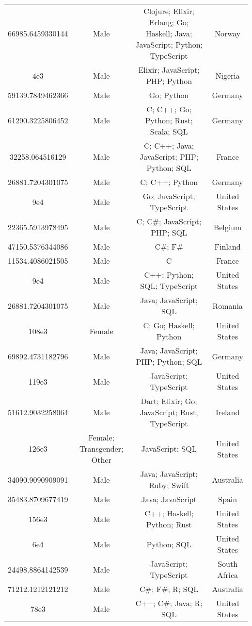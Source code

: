 \begin{center}
\begin{tabular}{ |c|c|c|c| }
66985.6459330144  &  Male  &  Clojure; Elixir; Erlang; Go; Haskell; Java; JavaScript; Python; TypeScript  &  Norway  \\ 
4e3  &  Male  &  Elixir; JavaScript; PHP; Python  &  Nigeria  \\ 
59139.7849462366  &  Male  &  Go; Python  &  Germany  \\ 
61290.3225806452  &  Male  &  C; C++; Go; Python; Rust; Scala; SQL  &  Germany  \\ 
32258.064516129  &  Male  &  C; C++; Java; JavaScript; PHP; Python; SQL  &  France  \\ 
26881.7204301075  &  Male  &  C; C++; Python  &  Germany  \\ 
9e4  &  Male  &  Go; JavaScript; TypeScript  &  United States  \\ 
22365.5913978495  &  Male  &  C; C\#; JavaScript; PHP; SQL  &  Belgium  \\ 
47150.5376344086  &  Male  &  C\#; F\#  &  Finland  \\ 
11534.4086021505  &  Male  &  C  &  France  \\ 
9e4  &  Male  &  C++; Python; SQL; TypeScript  &  United States  \\ 
26881.7204301075  &  Male  &  Java; JavaScript; SQL  &  Romania  \\ 
108e3  &  Female  &  C; Go; Haskell; Python  &  United States  \\ 
69892.4731182796  &  Male  &  Java; JavaScript; PHP; Python; SQL  &  Germany  \\ 
119e3  &  Male  &  JavaScript; TypeScript  &  United States  \\ 
51612.9032258064  &  Male  &  Dart; Elixir; Go; JavaScript; Rust; TypeScript  &  Ireland  \\ 
126e3  &  Female; Transgender; Other  &  JavaScript; SQL  &  United States  \\ 
34090.9090909091  &  Male  &  Java; JavaScript; Ruby; Swift  &  Australia  \\ 
35483.8709677419  &  Male  &  Java; JavaScript  &  Spain  \\ 
156e3  &  Male  &  C++; Haskell; Python; Rust  &  United States  \\ 
6e4  &  Male  &  Python; SQL  &  United States  \\ 
24498.8864142539  &  Male  &  JavaScript; TypeScript  &  South Africa  \\ 
71212.1212121212  &  Male  &  C\#; F\#; R; SQL  &  Australia  \\ 
78e3  &  Male  &  C++; C\#; Java; R; SQL  &  United States  \\ 

\end{tabular}
\end{center}
